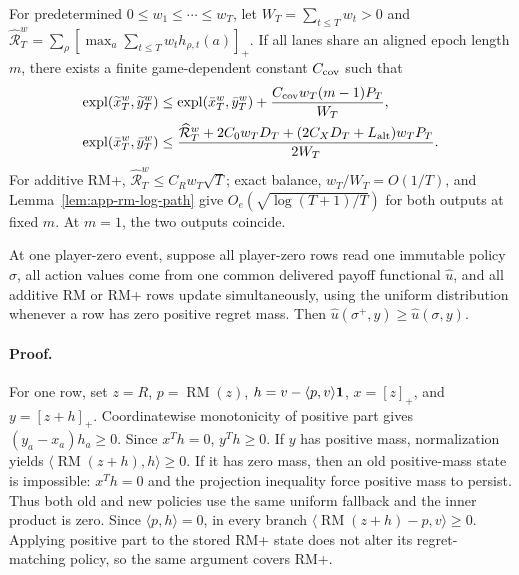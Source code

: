 \begin{corollary}
\label{cor:coverage-clock-output}
\label{cor:weighted-balanced-rmplus}%
For predetermined $0\le w_1\le\cdots\le w_T$, let
$W_T=\sum_{t\le T}w_t>0$ and
$\widehat{\mathcal R}_T^w=\sum_\rho[\max_a\sum_{t\le T}
w_th_{\rho,t}(a)]_+$.  If all lanes share an aligned epoch length $m$, there
exists a finite game-dependent constant $C_{\rm cov}$ such that
\begin{align}
\operatorname{expl}(\widetilde x_T^w,\widetilde y_T^w)
&\le \operatorname{expl}(\bar x_T^w,\bar y_T^w)
+\frac{C_{\rm cov}w_T(m-1)P_T}{W_T},
\label{eq:main-coreset-output}\\
\operatorname{expl}(\bar x_T^w,\bar y_T^w)
&\le \frac{\widehat{\mathcal R}_T^w+2C_0w_TD_T
+(2C_XD_T+L_{\rm alt})w_TP_T}{2W_T}.
\label{eq:weighted-balanced-rmplus}
\end{align}
For additive RM+, $\widehat{\mathcal R}_T^w\le C_Rw_T\sqrt T$; exact balance,
$w_T/W_T=O(1/T)$, and Lemma~\ref{lem:app-rm-log-path} give
$O_e(\sqrt{\log(T+1)/T})$ for both outputs at fixed $m$.  At $m=1$, the two
outputs coincide.
\end{corollary}

\begin{lemma}
\label{lem:app-global-monotonicity}
At one player-zero event, suppose all player-zero rows read one immutable
policy $\sigma$, all action values come from one common delivered payoff
functional $\widehat u$, and all additive RM or RM+ rows update
simultaneously, using the uniform distribution whenever a row has zero
positive regret mass.  Then
$\widehat u(\sigma^+,y)\ge\widehat u(\sigma,y)$.
\end{lemma}

\paragraph{Proof.}
For one row, set $z=R$, $p=\operatorname{RM}(z)$,
$h=v-\langle p,v\rangle\mathbf 1$, $x=[z]_+$, and $y=[z+h]_+$.  Coordinatewise
monotonicity of positive part gives $(y_a-x_a)h_a\ge0$.  Since $x^Th=0$,
$y^Th\ge0$.  If $y$ has positive mass, normalization yields
$\langle\operatorname{RM}(z+h),h\rangle\ge0$.  If it has zero mass, then an
old positive-mass state is impossible: $x^Th=0$ and the projection
inequality force positive mass to persist.  Thus both old and new policies
use the same uniform fallback and the inner product is zero.  Since
$\langle p,h\rangle=0$, in every branch
$\langle\operatorname{RM}(z+h)-p,v\rangle\ge0$.  Applying positive part to
the stored RM+ state does not alter its regret-matching policy, so the same
argument covers RM+.

